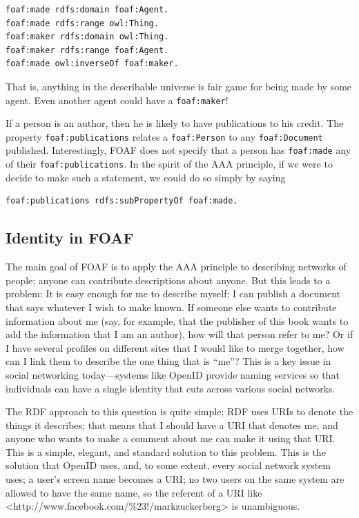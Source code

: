 \begin{lstlisting}
foaf:made rdfs:domain foaf:Agent.
foaf:made rdfs:range owl:Thing.
foaf:maker rdfs:domain owl:Thing.
foaf:maker rdfs:range foaf:Agent.
foaf:made owl:inverseOf foaf:maker.
\end{lstlisting}

That is, anything in the describable universe is fair game for being
made by some agent. Even another agent could have a \texttt{foaf:maker}!

If a person is an author, then he is likely to have publications to his
credit. The property \texttt{foaf:publications} relates a \texttt{foaf:Person} to any
\texttt{foaf:Document} published. Interestingly, FOAF does not specify that a
person has \texttt{foaf:made} any of their \texttt{foaf:publications}. In the spirit of
the AAA principle, if we were to decide to make such a statement, we
could do so simply by saying

\begin{lstlisting}
foaf:publications rdfs:subPropertyOf foaf:made.
\end{lstlisting}

\subsection{Identity in FOAF}

The main goal of FOAF is to apply the AAA principle to describing
networks of people; anyone can contribute descriptions about anyone. But
this leads to a problem: It is easy enough for me to describe myself; I
can publish a document that says whatever I wish to make known. If
someone else wants to contribute information about me (say, for example,
that the publisher of this book wants to add the information that I am
an author), how will that person refer to me? Or if I have several
profiles on different sites that I would like to merge together, how can
I link them to describe the one thing that is ``me''? This is a key
issue in social networking today---systems like OpenID provide naming
services so that individuals can have a single identity that cuts across
various social networks.

The RDF approach to this question is quite simple; RDF uses URIs to
denote the things it describes; that means that I should have a URI that
denotes me, and anyone who wants to make a comment about me can make it
using that URI. This is a simple, elegant, and standard solution to this
problem. This is the solution that OpenID uses, and, to some extent,
every social network system uses; a user's screen name becomes a URI; no
two users on the same system are allowed to have the same name, so the
referent of a URI like
\textless{}http://www.facebook.com/\%23!/markzuckerberg\textgreater{}
is unambiguous.

